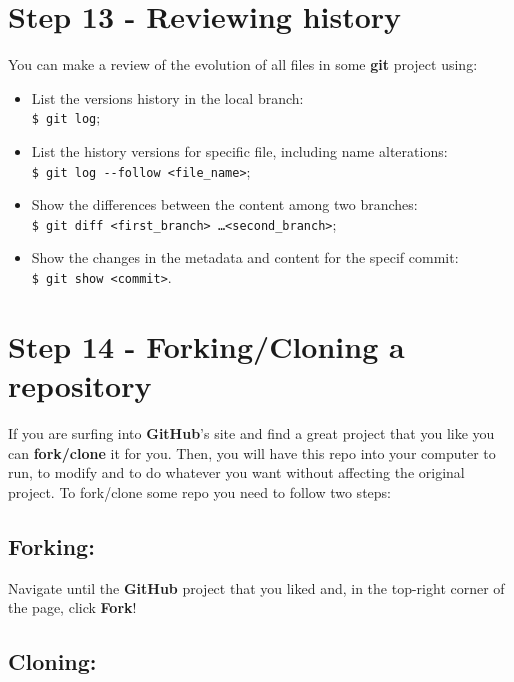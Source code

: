 \documentclass[12pt,a4paper,titlepage,brazil]{article}
\begin{document}
{%

\section{Step 13 - Reviewing history}

You can make a review of the evolution of all files in some {\bf git} project using:

\begin{itemize}
 \item List the versions history in the local branch:\\
   \texttt{\$ git log};
 \item List the history versions for specific file, including name alterations:\\
   \texttt{\$ git log -\hspace{0.01cm}-follow <file\_name>};
 \item Show the differences between the content among two branches:\\
   \texttt{\$ git diff <first\_branch> \dots <second\_branch>};
 \item Show the changes in the metadata and content for the specif commit:\\
   \texttt{\$ git show <commit>}.
\end{itemize}  



\section{Step 14 - Forking/Cloning a repository}

If you are surfing into {\bf GitHub}'s site and find a great project that you like you can {\bf fork/clone} it for you. Then, you will have this repo into your computer to run, to modify and to do whatever you want without affecting the original project. To fork/clone some repo you need to follow two steps:

\subsection{Forking:}

Navigate until the {\bf GitHub} project that you liked and, in the top-right corner of the page, click {\bf Fork}!

\subsection{Cloning:}

}
\end{document}
